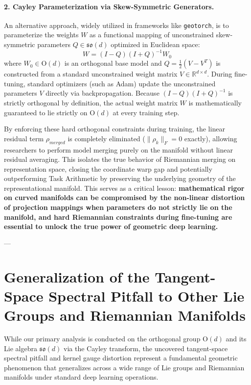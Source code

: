 \paragraph{2. Cayley Parameterization via Skew-Symmetric Generators.}
An alternative approach, widely utilized in frameworks like \texttt{geotorch}, is to parameterize the weights $W$ as a functional mapping of unconstrained skew-symmetric parameters $Q \in \mathfrak{so}(d)$ optimized in Euclidean space:
\begin{equation}
W = (I - Q)(I + Q)^{-1} W_0
\end{equation}
where $W_0 \in \mathrm{O}(d)$ is an orthogonal base model and $Q = \frac{1}{2}(V - V^T)$ is constructed from a standard unconstrained weight matrix $V \in \mathbb{R}^{d \times d}$. During fine-tuning, standard optimizers (such as Adam) update the unconstrained parameters $V$ directly via backpropagation. Because $(I - Q)(I + Q)^{-1}$ is strictly orthogonal by definition, the actual weight matrix $W$ is mathematically guaranteed to lie strictly on $\mathrm{O}(d)$ at every training step.

By enforcing these hard orthogonal constraints during training, the linear residual term $\rho_{merged}$ is completely eliminated ($\|\rho_k\|_F = 0$ exactly), allowing researchers to perform model merging purely on the manifold without linear residual averaging. This isolates the true behavior of Riemannian merging on representation space, closing the coordinate warp gap and potentially outperforming Task Arithmetic by preserving the underlying geometry of the representational manifold. This serves as a critical lesson: \textbf{mathematical rigor on curved manifolds can be compromised by the non-linear distortion of projection mappings when parameters do not strictly lie on the manifold, and hard Riemannian constraints during fine-tuning are essential to unlock the true power of geometric deep learning.}

---

\section{Generalization of the Tangent-Space Spectral Pitfall to Other Lie Groups and Riemannian Manifolds}
\label{sec:appendix_generalization}

While our primary analysis is conducted on the orthogonal group $\mathrm{O}(d)$ and its Lie algebra $\mathfrak{so}(d)$ via the Cayley transform, the uncovered tangent-space spectral pitfall and kernel gauge distortion represent a fundamental geometric phenomenon that generalizes across a wide range of Lie groups and Riemannian manifolds under standard deep learning operations.

